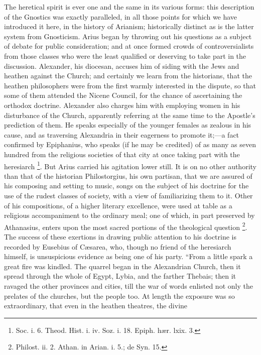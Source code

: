 The heretical spirit is ever one and the same in its various forms:
this description of the Gnostics was exactly paralleled, in all those
points for which we have introduced it here, in the history of
Arianism; historically distinct as is the latter system from
Gnosticism. Arius began by throwing out his questions as a subject of
debate for public consideration; and at once formed crowds of
controversialists from those classes who were the least qualified or
deserving to take part in the discussion. Alexander, his diocesan,
accuses him of siding with the Jews and heathen against the Church;
and certainly we learn from the historians, that the heathen
philosophers were from the first warmly interested in the dispute, so
that some of them attended the Nicene Council, for the chance of
ascertaining the orthodox doctrine. Alexander also charges him with
employing women in his disturbance of the Church, apparently referring
at the same time to the Apostle's prediction of them. He speaks
especially of the younger females as zealous in his cause, and as
traversing Alexandria in their eagerness to promote it;—a fact
confirmed by Epiphanius, who speaks (if he may be credited) of as many
as seven hundred from the religious societies of that city at once
taking part with the heresiarch \footnote{Soc. i. 6. Theod. Hist. i. iv. Soz. i. 18.
Epiph. hær. lxix. 3.}. But Arius carried his agitation lower still. It is on no other
authority than that of the historian Philostorgius, his own partisan,
that we are assured of his composing and setting to music, songs on
the subject of his doctrine for the use of the rudest classes of
society, with a view of familiarizing them to it. Other of his
compositions, of a higher literary excellence, were used at
table as a religious accompaniment to the ordinary meal; one of which,
in part preserved by Athanasius, enters upon the most sacred portions
of the theological question \footnote{Philost. ii. 2. Athan. in Arian. i. 5.; de
Syn. 15.}.
The success of these exertions in drawing public attention to his
doctrine is recorded by Eusebius of Cæsarea, who, though no friend of
the heresiarch himself, is unsuspicious evidence as being one of his
party. ``From a little spark a great fire was kindled. The quarrel
began in the Alexandrian Church, then it spread through the whole of
Egypt, Lybia, and the farther Thebais; then it ravaged the other
provinces and cities, till the war of words enlisted not only the
prelates of the churches, but the people too. At length the exposure
was so extraordinary, that even in the heathen theatres, the divine
